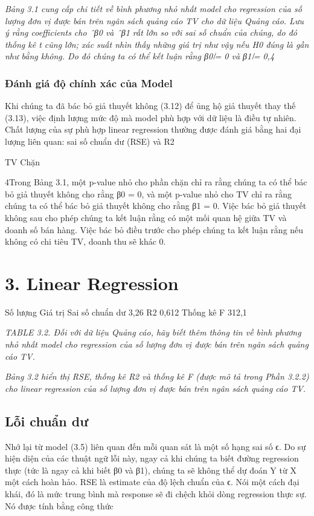 \noindent\textit{Bảng 3.1 cung cấp chi tiết về bình phương nhỏ nhất model cho regression của số lượng đơn vị được bán trên ngân sách quảng cáo TV cho dữ liệu Quảng cáo. Lưu ý rằng coefficients cho ˆβ0 và ˆβ1 rất lớn so với sai số chuẩn của chúng, do đó thống kê t cũng lớn; xác suất nhìn thấy những giá trị như vậy nếu H0 đúng là gần như bằng không. Do đó chúng ta có thể kết luận rằng β0 ̸= 0 và β1 ̸= 0,4}

\subsubsection{Đánh giá độ chính xác của Model}

Khi chúng ta đã bác bỏ giả thuyết không (3.12) để ủng hộ giả thuyết thay thế (3.13), việc định lượng mức độ mà model phù hợp với dữ liệu là điều tự nhiên. Chất lượng của sự phù hợp linear regression thường được đánh giá bằng hai đại lượng liên quan: sai số chuẩn dư (RSE) và R2

TV Chặn

4Trong Bảng 3.1, một p-value nhỏ cho phần chặn chỉ ra rằng chúng ta có thể bác bỏ giả thuyết không cho rằng β0 = 0, và một p-value nhỏ cho TV chỉ ra rằng chúng ta có thể bác bỏ giả thuyết không cho rằng β1 = 0. Việc bác bỏ giả thuyết không sau cho phép chúng ta kết luận rằng có một mối quan hệ giữa TV và doanh số bán hàng. Việc bác bỏ điều trước cho phép chúng ta kết luận rằng nếu không có chi tiêu TV, doanh thu sẽ khác 0.

\section{3. Linear Regression}

Số lượng Giá trị Sai số chuẩn dư 3,26 R2 0,612 Thống kê F 312,1

\noindent\textit{TABLE 3.2. Đối với dữ liệu Quảng cáo, hãy biết thêm thông tin về bình phương nhỏ nhất model cho regression của số lượng đơn vị được bán trên ngân sách quảng cáo TV.}

\noindent\textit{Bảng 3.2 hiển thị RSE, thống kê R2 và thống kê F (được mô tả trong Phần 3.2.2) cho linear regression của số lượng đơn vị được bán trên ngân sách quảng cáo TV.}

\subsection{Lỗi chuẩn dư}

Nhớ lại từ model (3.5) liên quan đến mỗi quan sát là một số hạng sai số ϵ. Do sự hiện diện của các thuật ngữ lỗi này, ngay cả khi chúng ta biết đường regression thực (tức là ngay cả khi biết β0 và β1), chúng ta sẽ không thể dự đoán Y từ X một cách hoàn hảo. RSE là estimate của độ lệch chuẩn của ϵ. Nói một cách đại khái, đó là mức trung bình mà response sẽ đi chệch khỏi dòng regression thực sự. Nó được tính bằng công thức

